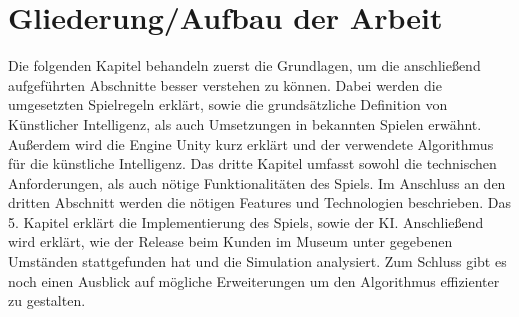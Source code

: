 

\section{Gliederung/Aufbau der Arbeit}
\label{ch:Einleitung:sec:Gliederung}


Die folgenden Kapitel behandeln zuerst die Grundlagen, um die anschließend aufgeführten Abschnitte besser verstehen zu können. Dabei werden die umgesetzten Spielregeln erklärt, sowie die grundsätzliche Definition von Künstlicher Intelligenz, als auch Umsetzungen in bekannten Spielen erwähnt. Außerdem wird die Engine Unity kurz erklärt und der verwendete Algorithmus für die künstliche Intelligenz. Das dritte Kapitel umfasst sowohl die technischen Anforderungen, als auch nötige Funktionalitäten des Spiels.
Im Anschluss an den dritten Abschnitt werden die nötigen Features und Technologien beschrieben.
Das 5. Kapitel erklärt die Implementierung des Spiels, sowie der KI. Anschließend wird erklärt, wie der Release beim Kunden im Museum unter gegebenen Umständen stattgefunden hat und die Simulation analysiert. Zum Schluss gibt es noch einen Ausblick auf mögliche Erweiterungen um den Algorithmus effizienter zu gestalten.

